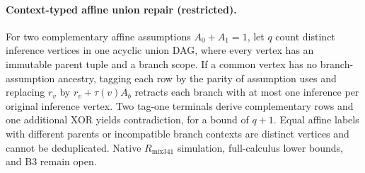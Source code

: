 \paragraph{Context-typed affine union repair (restricted).}
For two complementary affine assumptions $A_0+A_1=1$, let $q$ count
distinct inference vertices in one acyclic union DAG, where every vertex has
an immutable parent tuple and a branch scope.  If a common vertex has no
branch-assumption ancestry, tagging each row by the parity of assumption uses
and replacing $r_v$ by $r_v+\tau(v)A_b$ retracts each branch with at most one
inference per original inference vertex.  Two tag-one terminals derive
complementary rows and one additional XOR yields contradiction, for a bound
of $q+1$.  Equal affine labels with different parents or incompatible branch
contexts are distinct vertices and cannot be deduplicated.  Native
$R_{\mathrm{mix341}}$ simulation, full-calculus lower bounds, and B3 remain open.
